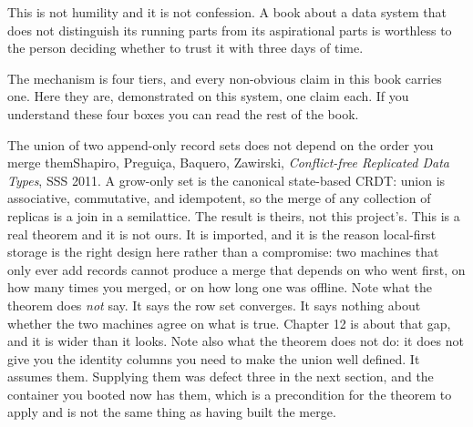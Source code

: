 This is not humility and it is not confession. A book about a data system that does not distinguish its running parts from its aspirational parts is worthless to the person deciding whether to trust it with three days of \labColdSystemShort{} time.

The mechanism is four tiers, and every non-obvious claim in this book carries one. Here they are, demonstrated on this system, one claim each. If you understand these four boxes you can read the rest of the book.

\begin{Theorem}{The union of two append-only record sets does not depend on the order you merge them}{Shapiro, Pregui\c{c}a, Baquero, Zawirski, \textit{Conflict-free Replicated Data Types}, SSS 2011.}
A grow-only set is the canonical state-based CRDT: union is associative, commutative, and idempotent, so the merge of any collection of replicas is a join in a semilattice. The result is theirs, not this project's.
This is a real theorem and it is not ours. It is imported, and it is the reason local-first storage is the right design here rather than a compromise: two machines that only ever add records cannot produce a merge that depends on who went first, on how many times you merged, or on how long one was offline. Note what the theorem does \emph{not} say. It says the row set converges. It says nothing about whether the two machines agree on what is true. Chapter 12 is about that gap, and it is wider than it looks. Note also what the theorem does not do: it does not give you the identity columns you need to make the union well defined. It assumes them. Supplying them was defect three in the next section, and the container you booted now has them, which is a precondition for the theorem to apply and is not the same thing as having built the merge.
\end{Theorem}

